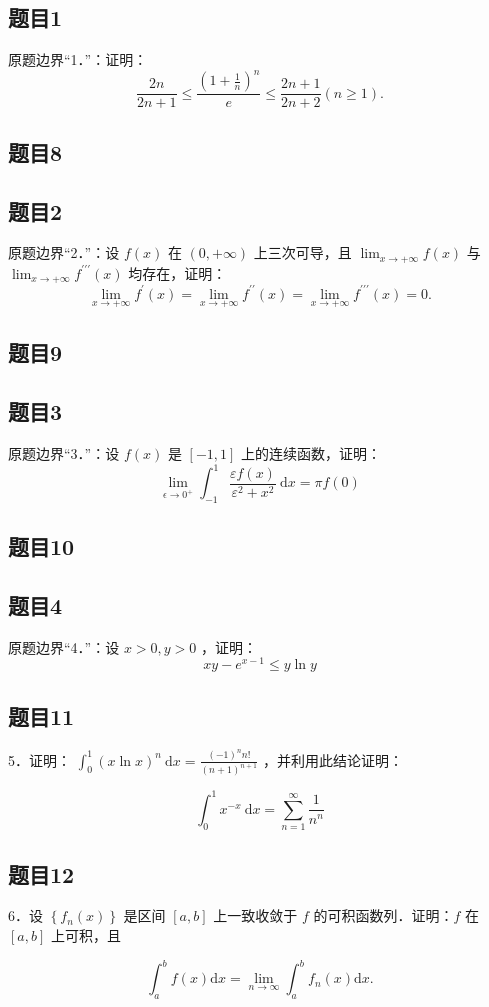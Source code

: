\documentclass{article}
\begin{document}
\subsection{题目1}
原题边界“1．”：证明：
\[
\frac{2 n}{2 n+1} \leq \frac{\left(1+\frac{1}{n}\right)^{n}}{e} \leq \frac{2 n+1}{2 n+2}(n \geq 1) .
\]

\subsection{题目8}

\subsection{题目2}
原题边界“2．”：设 \(f(x)\) 在 \((0,+\infty)\) 上三次可导，且 \(\lim _{x \rightarrow+\infty} f(x)\) 与 \(\lim _{x \rightarrow+\infty} f^{\prime \prime \prime}(x)\) 均存在，证明：
\[
\lim _{x \rightarrow+\infty} f^{\prime}(x)=\lim _{x \rightarrow+\infty} f^{\prime \prime}(x)=\lim _{x \rightarrow+\infty} f^{\prime \prime \prime}(x)=0 .
\]




\subsection{题目9}

\subsection{题目3}
原题边界“3．”：设 \(f(x)\) 是 \([-1,1]\) 上的连续函数，证明：
\[
\lim _{\epsilon \rightarrow 0^{+}} \int_{-1}^{1} \frac{\varepsilon f(x)}{\varepsilon^{2}+x^{2}} \mathrm{~d} x=\pi f(0)
\]

\subsection{题目10}

\subsection{题目4}
原题边界“4．”：设 \(x>0, y>0\) ，证明：
\[
x y-e^{x-1} \leq y \ln y
\]

\subsection{题目11}
5．证明： \(\int_{0}^{1}(x \ln x)^{n} \mathrm{~d} x=\frac{(-1)^{n} n!}{(n+1)^{n+1}}\) ，并利用此结论证明：

\[
\int_{0}^{1} x^{-x} \mathrm{~d} x=\sum_{n=1}^{\infty} \frac{1}{n^{n}}
\]

\subsection{题目12}
6．设 \(\left\{f_{n}(x)\right\}\) 是区间 \([a, b]\) 上一致收敛于 \(f\) 的可积函数列．证明：\(f\) 在 \([a, b]\) 上可积，且

\[
\int_{a}^{b} f(x) \mathrm{d} x=\lim _{n \rightarrow \infty} \int_{a}^{b} f_{n}(x) \mathrm{d} x .
\]
\end{document}
